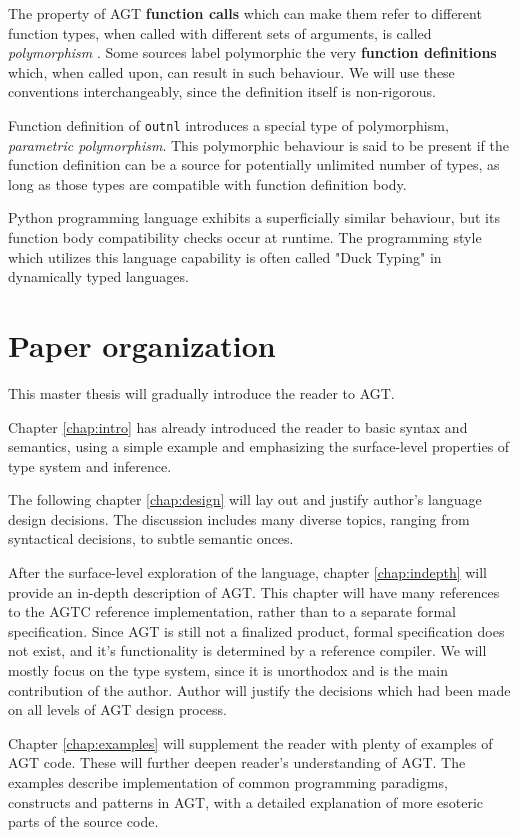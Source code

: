 \documentclass[times, utf8, diplomski]{fer}
\theoremstyle{definition}
\begin{document}
The property of AGT \textbf{function calls} which can make them refer to different function types, 
when called with different sets of arguments, is called \textit{polymorphism} \citep{c_polymorphism}.
Some sources label polymorphic the very \textbf{function definitions} which, when called upon, 
can result in such behaviour.
We will use these conventions interchangeably, since the definition itself is non-rigorous.

Function definition of \texttt{outnl} introduces a special type of polymorphism, 
\textit{parametric polymorphism}. This polymorphic behaviour is said to be present if the
function definition can be a source for potentially unlimited number of types, 
as long as those types are compatible with function definition body.

Python programming language exhibits a superficially similar behaviour, but its
function body compatibility checks occur at runtime. 
The programming style which utilizes this language capability is often called "Duck Typing" 
\citep{c_py_duck_typing} in dynamically typed languages.


\section{Paper organization}

This master thesis will gradually introduce the reader to AGT. 

Chapter \ref{chap:intro} has already introduced the reader to basic syntax and semantics,
using a simple example and emphasizing the surface-level properties of type system and inference. 

The following chapter \ref{chap:design} will lay out and justify author's
language design decisions. The discussion includes many diverse topics,
ranging from syntactical decisions, to subtle semantic onces.

After the surface-level exploration of the language, chapter \ref{chap:indepth}
will provide an in-depth description of AGT.
This chapter will have many references to the AGTC reference implementation, 
rather than to a separate formal specification. Since AGT is still not a finalized product,
formal specification does not exist, and it's functionality is determined by a reference compiler.
We will mostly focus on the type system, since it is unorthodox and is the main
contribution of the author.  Author will justify the decisions which had been
made on all levels of AGT design process.

Chapter \ref{chap:examples} will supplement the reader with plenty of examples of AGT code. These will
further deepen reader's understanding of AGT. The examples describe implementation
of common programming paradigms, constructs and patterns in AGT, with a detailed
explanation of more esoteric parts of the source code.
\end{document}
